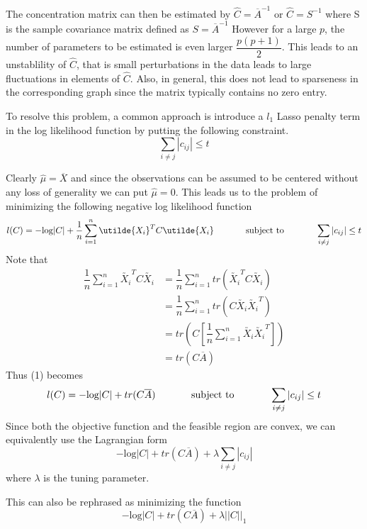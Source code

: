\documentclass[12pt]{article}
\begin{document}
The concentration matrix can then be estimated by $\hat{C}=\overline{A}^{-1}$ or $\hat{C}=S^{-1}$ where S is the sample covariance matrix defined as $S=\overline{A}^{-1}$ However for a large $p$, the number of parameters to be estimated is even larger $\dfrac{p(p+1)}{2}$. This leads to an unstablility of $\hat{C}$, that is small perturbations in the data leads to large fluctuations in elements of $\hat{C}$. Also, in general, this does not lead to sparseness in the corresponding graph since the matrix typically contains no zero entry.\cite{yuan2007model}

To resolve this problem, a common approach is introduce a $l_1$ Lasso penalty term in the log likelihood function by putting the following constraint. \[\sum\limits_{i\neq j}|c_{ij}|\leq t\]

Clearly $\hat{\mu}=\overline{X}$ and since the observations can be assumed to be centered without any loss of generality we can put $\hat{\mu}=0$. This leads us to the problem of minimizing the following negative log likelihood function
\begin{equation}
l(C)=-\text{log}|C|+\dfrac{1}{n}\sum\limits_{i=1}^n\utilde{X_i}^TC\utilde{X_i} \hspace{0.5in}\text{subject to}\hspace{0.5in} \sum\limits_{i\neq j}|c_{ij}|\leq t
\end{equation}
Note that 
\begin{equation*}
\begin{aligned}
\dfrac{1}{n}\sum\limits_{i=1}^n\utilde{X_i}^TC\utilde{X_i}&=\dfrac{1}{n}\sum\limits_{i=1}^ntr(\utilde{X_i}^TC\utilde{X_i})\\&=\dfrac{1}{n}\sum\limits_{i=1}^ntr(C\utilde{X_i}\utilde{X_i}^T)\\&=tr\left(C\left[\dfrac{1}{n}\sum\limits_{i=1}^n\utilde{X_i}\utilde{X_i}^T\right]\right)\\&=tr(C\overline{A})
\end{aligned}
\end{equation*}
Thus (1) becomes \[l(C)=-\text{log}|C|+tr(C\overline{A}) \hspace{0.5in}\text{subject to}\hspace{0.5in} \sum\limits_{i\neq j}|c_{ij}|\leq t\] Since both the objective function and the feasible region are convex, we can equivalently use the Lagrangian form \[-\text{log}|C|+tr(C\overline{A})+\lambda\sum\limits_{i\neq j}|c_{ij}|\]
where $\lambda$ is the tuning parameter.

This can also be rephrased as minimizing the function 
\begin{equation}
-\text{log}|C|+tr(C\overline{A})+\lambda||C||_1
\end{equation}
\end{document}
